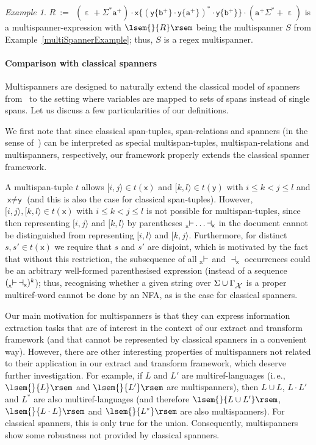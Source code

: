 \documentclass[
a4paper
]{article}
\theoremstyle{plain}
\theoremstyle{definition}
\theoremstyle{remark}
\newtheorem{example}[theorem]{Example}
\DeclareMathOperator{\eword}{\varepsilon}
\newcommand{\varset}{\mbox{\ensuremath{\mathcal{X}}}}
\DeclareMathOperator{\openmark}{\vdash}
\DeclareMathOperator{\closemark}{\dashv}
\newcommand{\spann}[2]{\ensuremath{[#1,#2\rangle}}
\newcommand{\open}[1]{\prescript{}{#1}{\openmark}}
\newcommand{\close}[1]{\closemark_{#1}}
\newcommand{\ta}{\ensuremath{\mathtt{a}}}
\newcommand{\tb}{\ensuremath{\mathtt{b}}}
\newcommand{\varsx}{\ensuremath{\textsf{x}}}
\newcommand{\varsy}{\ensuremath{\textsf{y}}}
\newcommand{\sem}[1]{{\lsem{}{#1}\rsem}}
\begin{document}
\begin{example}
$R \ := \ \ (\eword + \Sigma^* \ta^+) \cdot \varsx\big\{ (\varsy\{ \tb^+ \} \cdot \varsy\{ \ta^+ \})^* \cdot \varsy\{ \tb^+ \} \big\} \cdot (\ta^+ \Sigma^* + \eword)$ is a multispanner-expression with $\sem{R}$ being the multispanner $S$ from Example~\ref{multiSpannerExample}; thus, $S$ is a regex multispanner.
\end{example}

\paragraph{Comparison with classical spanners} Multispanners are designed to naturally extend the classical model of spanners from~\cite{fagin2015document} to the setting where variables are mapped to sets of spans instead of single spans. Let us discuss a few particularities of our definitions.

We first note that since classical span-tuples, span-relations and spanners (in the sense of~\cite{fagin2015document}) can be interpreted as special multi\-span-tuples, multispan-relations and multispanners, respectively, our framework properly extends the classical spanner framework. 

A multispan-tuple $t$ allows $\spann{i}{j} \in t(\varsx)$ and $\spann{k}{l} \in t(\varsy)$ with $i \leq k < j \leq l$ and $\varsx \neq \varsy$ (and this is also the case for classical span-tuples). However, 
$\spann{i}{j}, \spann{k}{l} \in t(\varsx)$ with $i \leq k < j \leq l$ is not possible for multispan-tuples, since then representing $\spann{i}{j}$ and $\spann{k}{l}$ by parentheses $\open{\varsx} \ldots \close{\varsx}$ in the document cannot be distinguished from representing $\spann{i}{l}$ and $\spann{k}{j}$. Furthermore, 
for distinct $s, s' \in t(\varsx)$ we require
that $s$ and $s'$ are disjoint, which is motivated by the fact that without this restriction, the subsequence of all $\open{\varsx}$ and $\close{\varsx}$ occurrences could be an arbitrary well-formed parenthesised expression (instead of a sequence $(\open{\varsx} \close{\varsx})^k$); thus, recognising whether a given string over $\Sigma \cup \Gamma_{\varset}$ 
is a proper multiref-word cannot be done by an NFA, as is the case for classical spanners.

Our main motivation for multispanners is that they can express information extraction tasks that are of interest in the context of our extract and transform framework (and that cannot be represented by classical spanners in a convenient way). However, there are other interesting properties of multispanners not related to their application in our extract and transform framework, which deserve further investigation. For example, if $L$ and $L'$ are multiref-languages (i.\,e., $\sem{L}$ and $\sem{L'}$ are multispanners), then $L \cup L$, $L \cdot L'$ and $L^*$ are also multi\-ref-languages (and therefore $\sem{L \cup L'}$, $\sem{L \cdot L}$ and $\sem{L^*}$ are also multispanners). For classical spanners, this is only true for the union. Consequently, multispanners show some robustness not provided by classical spanners. 
\end{document}
